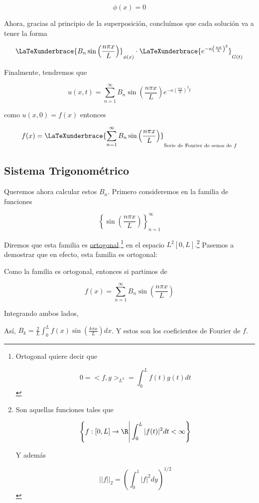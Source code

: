 \[
    \phi(x) = 0
\]

Ahora, gracias al principio de la superposición, concluímos que cada solución va a tener la forma

\[
    \LaTeXunderbrace{B_n\sin\left( \frac{n\pi x}{L} \right)}_{\phi(x)} \cdot \LaTeXunderbrace{\vphantom{\left( \frac{n\pi x}{L} \right)}e^{-\kappa \left( \frac{n\pi}{L} \right)^2 }}_{G(t)}
\]

Finalmente, tendremos que

\[
    u(x,t) = \sum_{n = 1}^{\infty} B_n\sin\left( \frac{n\pi x}{L} \right) e^{-\kappa \left( \frac{n\pi}{L} \right)^2 t}
\]

\noindent
como $u(x,0) = f(x)$ entonces

\[
    f(x) = \LaTeXunderbrace{\sum_{n = 1}^{\infty} B_n\sin\left( \frac{n\pi x}{L} \right)}_{\text{Serie de Fourier de senos de $f$}}
\]

\subsection{Sistema Trigonométrico}

Queremos ahora calcular estos $B_n$. Primero consideremos en la familia de funciones

\[
    \left\{ \sin\left( \frac{n\pi x}{L} \right) \right\}^{\infty}_{n = 1}
\]

Diremos que esta familia es  \ul{ortogonal}.\footnote{Ortogonal quiere decir que

\[
    0 = <f, g>_{L^2} = \int_0^L f(t)g(t)dt
\]} en el espacio $L^2[0, L].$\footnote{Son aquellas funciones tales que

\[
    \left\{ f: [0, L] \rightarrow \R \Bigg| \int_0^L |f(t)|^2 dt < \infty \right\}
\]

Y además

\[
    ||f||_2 = \left( \int_0^1 |f|^2 dy \right)^{1/2}
\]} Pasemos a demostrar que en efecto, esta familia es ortogonal:


Como la familia es ortogonal, entonces si partimos de

\[
    f(x) = \sum_{n = 1}^{\infty} B_n\sin\left( \frac{n\pi x}{L} \right)
\]

Integrando ambos lados,


Así, $B_k = \frac{2}{L} \int_0^L f(x) \sin(\frac{k\pi x}{L}) dx$. Y estos son los coeficientes de Fourier de $f$.










